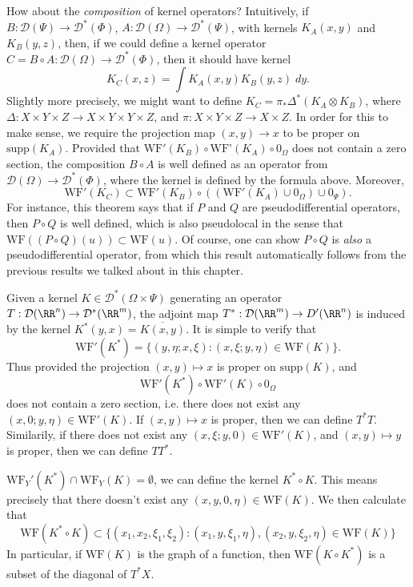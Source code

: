 How about the \emph{composition} of kernel operators? Intuitively, if $B: \mathcal{D}(\Psi) \to \mathcal{D}^*(\Phi)$, $A: \mathcal{D}(\Omega) \to \mathcal{D}^*(\Psi)$, with kernels $K_A(x,y)$ and $K_B(y,z)$, then, if we could define a kernel operator $C = B \circ A: \mathcal{D}(\Omega) \to \mathcal{D}^*(\Phi)$, then it should have kernel
%
\[ K_C(x,z) = \int K_A(x,y) K_B(y,z)\; dy. \]
%
Slightly more precisely, we might want to define $K_C = \pi_* \Delta^*(K_A \otimes K_B)$, where $\Delta: X \times Y \times Z \to X \times Y \times Y \times Z$, and $\pi: X \times Y \times Z \to X \times Z$. In order for this to make sense, we require the projection map $(x,y) \to x$ to be proper on $\text{supp}(K_A)$. Provided that $\text{WF}'(K_B) \circ \text{WF'}(K_A) \circ 0_\Omega$ does not contain a zero section, the composition $B \circ A$ is well defined as an operator from $\mathcal{D}(\Omega) \to \mathcal{D}^*(\Phi)$, where the kernel is defined by the formula above. Moreover,
%
\[ \text{WF}'(K_C) \subset \text{WF}'(K_B) \circ ((\text{WF}'(K_A) \cup 0_\Omega) \cup 0_\Psi). \]
%
For instance, this theorem says that if $P$ and $Q$ are pseudodifferential operators, then $P \circ Q$ is well defined, which is also pseudolocal in the sense that $\text{WF}((P \circ Q)(u)) \subset \text{WF}(u)$. Of course, one can show $P \circ Q$ is \emph{also} a pseudodifferential operator, from which this result automatically follows from the previous results we talked about in this chapter.

\begin{example}
    Given a kernel $K \in \mathcal{D}^*(\Omega \times \Psi)$ generating an operator $T: \mathcal{D}(\RR^n) \to \mathcal{D}^*(\RR^m)$, the adjoint map $T^*: \mathcal{D}(\RR^m) \to D'(\RR^n)$ is induced by the kernel $K^*(y,x) = \overline{K(x,y)}$. It is simple to verify that
    \[ \text{WF}'(K^*) = \{ (y,\eta;x,\xi) : (x,\xi;y,\eta) \in \text{WF}(K) \}. \]
    Thus provided the projection $(x,y) \mapsto x$ is proper on $\text{supp}(K)$, and
    \[ \text{WF}'(K^*) \circ \text{WF}'(K) \circ 0_\Omega \]
    does not contain a zero section, i.e. there does not exist any $(x,0;y,\eta) \in \text{WF}'(K)$. If $(x,y) \mapsto x$ is proper, then we can define $T^* T$. Similarily, if there does not exist any $(x,\xi;y,0) \in \text{WF}'(K)$, and $(x,y) \mapsto y$ is proper, then we can define $T T^*$.

    $\text{WF}_Y'(K^*) \cap \text{WF}_Y(K) = \emptyset$, we can define the kernel $K^* \circ K$. This means precisely that there doesn't exist any $(x,y,0,\eta) \in \text{WF}(K)$. We then calculate that
    \[ \text{WF}(K^* \circ K) \subset \{ (x_1,x_2,\xi_1,\xi_2) : (x_1,y,\xi_1,\eta), (x_2,y,\xi_2,\eta) \in \text{WF}(K) \} \]
    In particular, if $\text{WF}(K)$ is the graph of a function, then $\text{WF}(K \circ K^*)$ is a subset of the diagonal of $T^* X$.
\end{example}




